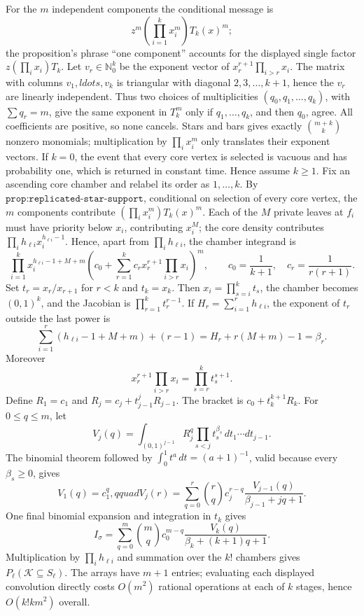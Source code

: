 For the \(m\) independent components the conditional message is
\[
 z^m\left(\prod_{i=1}^kx_i^m\right)T_k(x)^m;
\]
the proposition's phrase ``one component'' accounts for the displayed single factor \(z(\prod_i x_i)T_k\).  Let \(v_r\in\mathbb N_0^k\) be the exponent vector of \(x_r^{r+1}\prod_{i>r}x_i\).  The matrix with columns \(v_1,ldots,v_k\) is triangular with diagonal \(2,3,\ldots,k+1\), hence the \(v_r\) are linearly independent.  Thus two choices of multiplicities \((q_0,q_1,\ldots,q_k)\), with \(\sum q_r=m\), give the same exponent in \(T_k^m\) only if \(q_1,\ldots,q_k\), and then \(q_0\), agree.  All coefficients are positive, so none cancels.  Stars and bars gives exactly \(\binom{m+k}{k}\) nonzero monomials; multiplication by \(\prod_i x_i^m\) only translates their exponent vectors.
If \(k=0\), the event that every core vertex is selected is vacuous and has probability one, which is returned in constant time.  Hence assume \(k\ge1\).  Fix an ascending core chamber and relabel its order as \(1,\ldots,k\).  By \(\texttt{prop:replicated-star-support}\), conditional on selection of every core vertex, the \(m\) components contribute \((\prod_i x_i^m)T_k(x)^m\).  Each of the \(M\) private leaves at \(f_i\) must have priority below \(x_i\), contributing \(x_i^M\); the core density contributes \(\prod_i h_{\ell i}x_i^{h_{\ell i}-1}\).  Hence, apart from \(\prod_i h_{\ell i}\), the chamber integrand is
\[
 \prod_{i=1}^kx_i^{h_{\ell i}-1+M+m}
 \left(c_0+\sum_{r=1}^kc_r x_r^{r+1}\prod_{i>r}x_i\right)^m,
 \qquad c_0=\frac1{k+1},\quad c_r=\frac1{r(r+1)}.
\]
Set \(t_r=x_r/x_{r+1}\) for \(r<k\) and \(t_k=x_k\).  Then \(x_i=\prod_{s=i}^kt_s\), the chamber becomes \((0,1)^k\), and the Jacobian is \(\prod_{r=1}^kt_r^{r-1}\).  If \(H_r=\sum_{i=1}^rh_{\ell i}\), the exponent of \(t_r\) outside the last power is
\[
 \sum_{i=1}^r(h_{\ell i}-1+M+m)+(r-1)=H_r+r(M+m)-1=\beta_r.
\]
Moreover
\[
 x_r^{r+1}\prod_{i>r}x_i=\prod_{s=r}^kt_s^{s+1}.
\]
Define \(R_1=c_1\) and \(R_j=c_j+t_{j-1}^jR_{j-1}\).  The bracket is \(c_0+t_k^{k+1}R_k\).  For \(0\le q\le m\), let
\[
 V_j(q)=\int_{(0,1)^{j-1}}R_j^q\prod_{s<j}t_s^{\beta_s}\,dt_1\cdots dt_{j-1}.
\]
The binomial theorem followed by \(\int_0^1t^a\,dt=(a+1)^{-1}\), valid because every \(\beta_s\ge0\), gives
\[
 V_1(q)=c_1^q,qquad
 V_j(r)=\sum_{q=0}^r\binom rq c_j^{r-q}
       \frac{V_{j-1}(q)}{\beta_{j-1}+jq+1}.
\]
One final binomial expansion and integration in \(t_k\) gives
\[
 I_\sigma=\sum_{q=0}^m\binom mq c_0^{m-q}
       \frac{V_k(q)}{\beta_k+(k+1)q+1}.
\]
Multiplication by \(\prod_i h_{\ell i}\) and summation over the \(k!\) chambers gives \(P_\ell(\mathcal K\subseteq S_\ell)\).  The arrays have \(m+1\) entries; evaluating each displayed convolution directly costs \(O(m^2)\) rational operations at each of \(k\) stages, hence \(O(k!km^2)\) overall.

